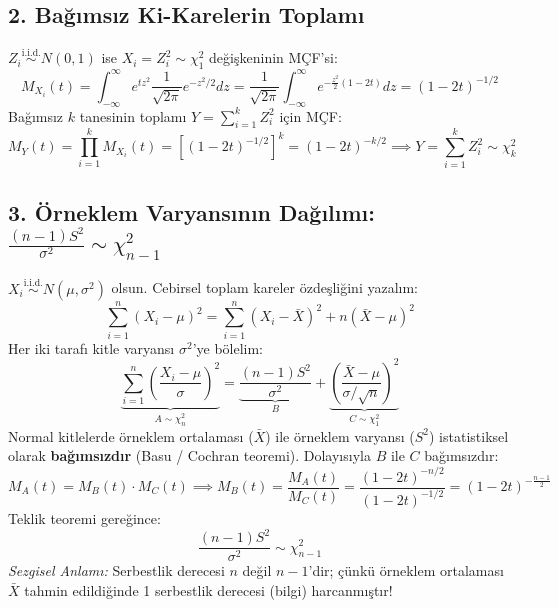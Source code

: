 \documentclass[12pt,a4paper]{article}
\begin{document}
\subsection{2. Bağımsız Ki-Karelerin Toplamı}

$Z_i \overset{\text{i.i.d.}}{\sim} N(0, 1)$ ise $X_i = Z_i^2 \sim \chi^2_1$ değişkeninin MÇF'si:
\begin{equation}
    M_{X_i}(t) = \int_{-\infty}^{\infty} e^{tz^2} \frac{1}{\sqrt{2\pi}} e^{-z^2/2} dz = \frac{1}{\sqrt{2\pi}} \int_{-\infty}^{\infty} e^{-\frac{z^2}{2}(1 - 2t)} dz = (1 - 2t)^{-1/2}
\end{equation}
Bağımsız $k$ tanesinin toplamı $Y = \sum_{i=1}^k Z_i^2$ için MÇF:
\begin{equation}
    M_Y(t) = \prod_{i=1}^k M_{X_i}(t) = \left[ (1 - 2t)^{-1/2} \right]^k = (1 - 2t)^{-k/2} \implies \boxed{Y = \sum_{i=1}^k Z_i^2 \sim \chi^2_k}
\end{equation}

\subsection{3. Örneklem Varyansının Dağılımı: \texorpdfstring{$\frac{(n-1)S^2}{\sigma^2} \sim \chi^2_{n-1}$}{(n-1)S^2/sigma^2 ~ Ki-kare(n-1)}}

$X_i \overset{\text{i.i.d.}}{\sim} N(\mu, \sigma^2)$ olsun. Cebirsel toplam kareler özdeşliğini yazalım:
\begin{equation}
    \sum_{i=1}^n (X_i - \mu)^2 = \sum_{i=1}^n (X_i - \bar{X})^2 + n(\bar{X} - \mu)^2
\end{equation}
Her iki tarafı kitle varyansı $\sigma^2$'ye bölelim:
\begin{equation}
    \underbrace{\sum_{i=1}^n \left(\frac{X_i - \mu}{\sigma}\right)^2}_{A \sim \chi^2_n} = \underbrace{\frac{(n-1)S^2}{\sigma^2}}_{B} + \underbrace{\left(\frac{\bar{X} - \mu}{\sigma/\sqrt{n}}\right)^2}_{C \sim \chi^2_1}
\end{equation}
Normal kitlelerde örneklem ortalaması ($\bar{X}$) ile örneklem varyansı ($S^2$) istatistiksel olarak \textbf{bağımsızdır} (Basu / Cochran teoremi). Dolayısıyla $B$ ile $C$ bağımsızdır:
\begin{equation}
    M_A(t) = M_B(t) \cdot M_C(t) \implies M_B(t) = \frac{M_A(t)}{M_C(t)} = \frac{(1 - 2t)^{-n/2}}{(1 - 2t)^{-1/2}} = (1 - 2t)^{-\frac{n-1}{2}}
\end{equation}
Teklik teoremi gereğince:
\begin{equation}
    \boxed{\frac{(n-1)S^2}{\sigma^2} \sim \chi^2_{n-1}}
\end{equation}
\textit{Sezgisel Anlamı:} Serbestlik derecesi $n$ değil $n-1$'dir; çünkü örneklem ortalaması $\bar{X}$ tahmin edildiğinde 1 serbestlik derecesi (bilgi) harcanmıştır!
\end{document}
